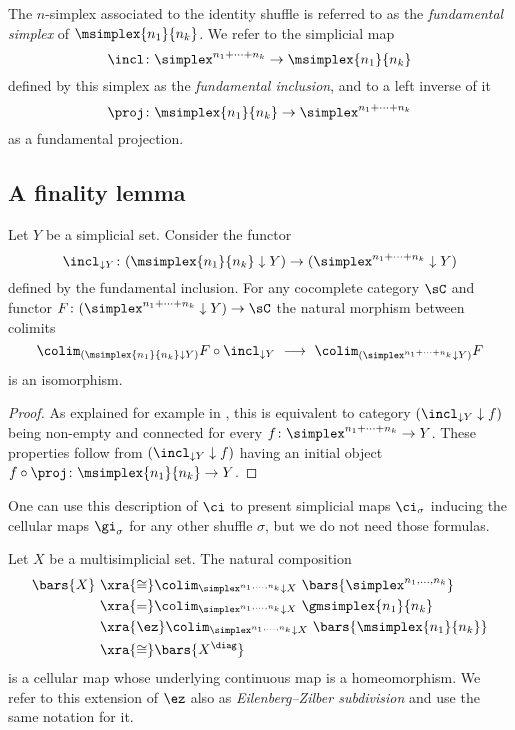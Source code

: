 The $n$-simplex associated to the identity shuffle is referred to as the \textit{fundamental simplex} of $\msimplex{n_1}{n_k}$.
We refer to the simplicial map
\[
\incl \colon
\simplex^{n_1+\dots+n_k} \to
\msimplex{n_1}{n_k}
\]
defined by this simplex as the \textit{fundamental inclusion}, and to a left inverse of it
\[
\proj \colon
\msimplex{n_1}{n_k} \to
\simplex^{n_1+\dots+n_k}
\]
as a fundamental projection. 

\subsection{A finality lemma} \label{ss:finality}

Let $Y$ be a simplicial set.
Consider the functor
\[
\incl_{\downarrow Y} \colon (\msimplex{n_1}{n_k} \downarrow Y) \to (\simplex^{n_1+\dots+n_k} \downarrow Y)
\]
defined by the fundamental inclusion.
For any cocomplete category $\sC$ and functor $F \colon (\simplex^{n_1+\dots+n_k} \downarrow Y) \to \sC$ the natural morphism between colimits
\[
\colim_{(\msimplex{n_1}{n_k} \downarrow Y)} F \circ \incl_{\downarrow Y} \
\longrightarrow \
\colim_{(\simplex^{n_1+\dots+n_k} \downarrow Y)} F
\]
is an isomorphism.

\begin{proof}
	As explained for example in \cite[]{riehl2014categorical}, this is equivalent to category $(\incl_{\downarrow Y} \downarrow f)$ being non-empty and connected for every $f \colon \simplex^{n_1+\dots+n_k} \to Y$.
	These properties follow from $(\incl_{\downarrow Y} \downarrow f)$ having an initial object $f \circ \proj \colon \msimplex{n_1}{n_k} \to Y$.
\end{proof}


\newpage

One can use this description of $\ci$ to present simplicial maps $\ci_\sigma$ inducing the cellular maps $\gi_\sigma$ for any other shuffle $\sigma$, but we do not need those formulas.

Let $X$ be a multisimplicial set.
The natural composition
\begin{align*}
	\bars{X} \ &\xra{\cong}
	\colim_{\simplex^{n_1,\dots,n_k} \downarrow X} \ \bars{\simplex^{n_1,\dots,n_k}} \\ &\xra{=}
	\colim_{\simplex^{n_1,\dots,n_k} \downarrow X} \ \gmsimplex{n_1}{n_k} \\ &\xra{\ez}
	\colim_{\simplex^{n_1,\dots,n_k} \downarrow X} \ \bars{\msimplex{n_1}{n_k}} \\ &\xra{\cong}
	\bars{X^{\diag}}
\end{align*}
is a cellular map whose underlying continuous map is a homeomorphism.
We refer to this extension of $\ez$ also as \textit{Eilenberg--Zilber subdivision} and use the same notation for it.

